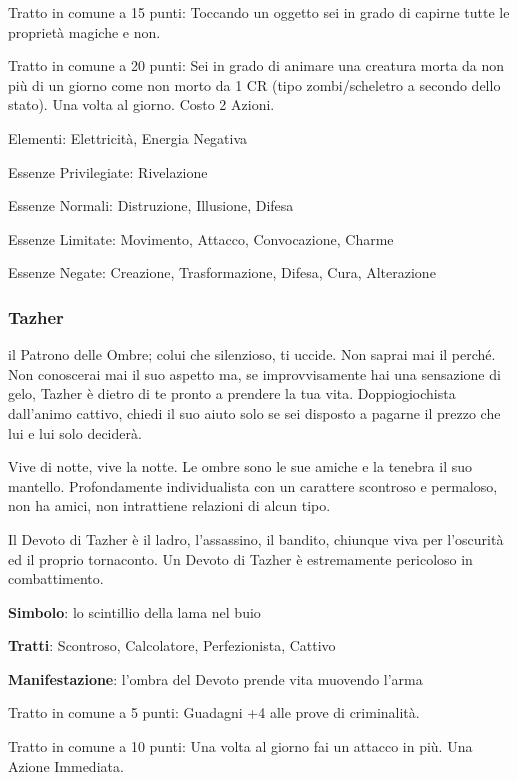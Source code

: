 \documentclass[a4paper,11pt,twoside,openany]{book}
\begin{document}
Tratto in comune a 15 punti: Toccando un oggetto sei in grado di capirne tutte le proprietà magiche e non.

Tratto in comune a 20 punti: Sei in grado di animare una creatura morta da non più di un giorno come non morto da 1 CR (tipo zombi/scheletro a secondo dello stato). Una volta al giorno. Costo 2 Azioni.

\bigskip

Elementi: Elettricità, Energia Negativa

\bigskip

Essenze Privilegiate: Rivelazione

Essenze Normali: Distruzione, Illusione, Difesa

Essenze Limitate: Movimento, Attacco, Convocazione, Charme

Essenze Negate: Creazione, Trasformazione, Difesa, Cura, Alterazione

\subsubsection{Tazher}

\label{tazher}

il Patrono delle Ombre; colui che silenzioso, ti uccide. Non saprai mai il perché. Non conoscerai mai il suo aspetto ma, se improvvisamente hai una sensazione di gelo, Tazher è dietro di te pronto a prendere la tua vita.
Doppiogiochista dall'animo cattivo, chiedi il suo aiuto solo se sei disposto a pagarne il prezzo che lui e lui solo deciderà.

Vive di notte, vive la notte. Le ombre sono le sue amiche e la tenebra il suo mantello. Profondamente individualista con un carattere scontroso e permaloso, non ha amici, non intrattiene relazioni di alcun tipo.

Il Devoto di Tazher è il ladro, l'assassino, il bandito, chiunque viva per l'oscurità ed il proprio tornaconto. Un Devoto di Tazher è estremamente pericoloso in combattimento.

\textbf{Simbolo}: lo scintillio della lama nel buio

\textbf{Tratti}: Scontroso, Calcolatore, Perfezionista, Cattivo

\textbf{Manifestazione}: l'ombra del Devoto prende vita muovendo l'arma

\bigskip

Tratto in comune a 5 punti: Guadagni +4 alle prove di criminalità.

Tratto in comune a 10 punti: Una volta al giorno fai un attacco in più. Una Azione Immediata.
\end{document}
